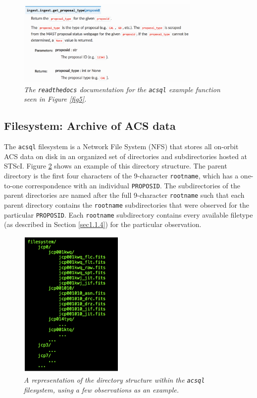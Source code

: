 \documentclass[10pt,journal,compsoc]{IEEEtran}
\begin{document}
\begin{figure}[!t]
\centering
\includegraphics[width=3.5in]{./figures/readthedocs.png}
\caption{\textit{The \texttt{readthedocs} documentation for the \texttt{acsql} example function seen in Figure \ref{fig5}.}}
\label{fig6}
\end{figure}


\subsection{Filesystem: Archive of ACS data} \label{sec3.3}

The \texttt{acsql} filesystem is a Network File System (NFS) that stores all on-orbit ACS data on disk in an organized set of directories and subdirectories hosted at STScI.
Figure \ref{fig7} shows an example of this directory structure.  The parent directory is the first four characters of the 9-character \texttt{rootname}, which has a one-to-one
correspondence with an individual \texttt{PROPOSID}. The subdirectories of the parent directories are named after the full 9-character \texttt{rootname} such that each parent directory
contains the \texttt{rootname} subdirectories that were observed for the particular \texttt{PROPOSID}.  Each \texttt{rootname} subdirectory contains every available filetype
(as described in Section \ref{sec1.1.4}) for the particular observation.

\begin{figure}[!h]
\centering
\includegraphics[width=2.0in]{./figures/filesystem_structure.png}
\caption{\textit{A representation of the directory structure within the \texttt{acsql} filesystem, using a few observations as an example.}}
\label{fig7}
\end{figure}
\end{document}
